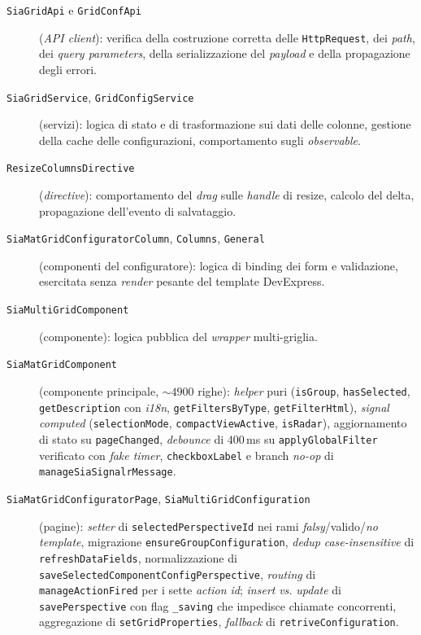 \begin{description}
    \item[\texttt{SiaGridApi} e \texttt{GridConfApi}] (\emph{API client}): verifica della costruzione corretta delle \texttt{HttpRequest}, dei \emph{path}, dei \emph{query parameters}, della serializzazione del \emph{payload} e della propagazione degli errori.
    \item[\texttt{SiaGridService}, \texttt{GridConfigService}] (servizi): logica di stato e di trasformazione sui dati delle colonne, gestione della cache delle configurazioni, comportamento sugli \emph{observable}.
    \item[\texttt{ResizeColumnsDirective}] (\emph{directive}): comportamento del \emph{drag} sulle \emph{handle} di resize, calcolo del delta, propagazione dell'evento di salvataggio.
    \item[\texttt{SiaMatGridConfiguratorColumn}, \texttt{Columns}, \texttt{General}] (componenti del configuratore): logica di binding dei form e validazione, esercitata senza \emph{render} pesante del template DevExpress.
    \item[\texttt{SiaMultiGridComponent}] (componente): logica pubblica del \emph{wrapper} multi-griglia.
    \item[\texttt{SiaMatGridComponent}] (componente principale, $\sim$$4900$ righe): \emph{helper} puri (\texttt{isGroup}, \texttt{hasSelected}, \texttt{getDescription} con \emph{i18n}, \texttt{getFiltersByType}, \texttt{getFilterHtml}), \emph{signal computed} (\texttt{selectionMode}, \texttt{compactViewActive}, \texttt{isRadar}), aggiornamento di stato su \texttt{pageChanged}, \emph{debounce} di $400$\,ms su \texttt{applyGlobalFilter} verificato con \emph{fake timer}, \texttt{checkboxLabel} e branch \emph{no-op} di \texttt{manageSiaSignalrMessage}.
    \item[\texttt{SiaMatGridConfiguratorPage}, \texttt{SiaMultiGridConfiguration}] (pagine): \emph{setter} di \texttt{selectedPerspectiveId} nei rami \emph{falsy}/valido/\emph{no template}, migrazione \texttt{ensureGroupConfiguration}, \emph{dedup} \emph{case-insensitive} di \texttt{refreshDataFields}, normalizzazione di \texttt{saveSelectedComponentConfigPerspective}, \emph{routing} di \texttt{manageActionFired} per i sette \emph{action id}; \emph{insert} \emph{vs.} \emph{update} di \texttt{savePerspective} con flag \texttt{\_saving} che impedisce chiamate concorrenti, aggregazione di \texttt{setGridProperties}, \emph{fallback} di \texttt{retriveConfiguration}.
\end{description}

